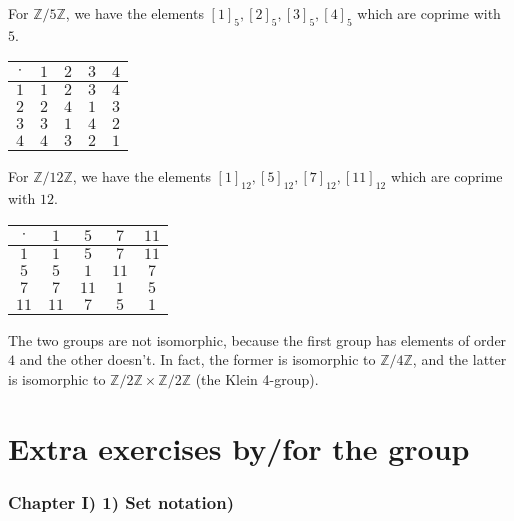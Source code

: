 \documentclass[12pt, letterpaper, twoside]{report}
\begin{document}
For $\mathbb{Z}/5\mathbb{Z}$, we have the elements $[1]_5, [2]_5, [3]_5, [4]_5$ which are coprime with $5$.

\vspace{1em}
\begin{tabular}{|c||c|c|c|c|}
\hline
$\cdot$ & $1$ & $2$ & $3$ & $4$ \\ \hline \hline
$1    $ & $1$ & $2$ & $3$ & $4$ \\ \hline
$2    $ & $2$ & $4$ & $1$ & $3$ \\ \hline
$3    $ & $3$ & $1$ & $4$ & $2$ \\ \hline
$4    $ & $4$ & $3$ & $2$ & $1$ \\ \hline
\end{tabular}
\vspace{1em}

For $\mathbb{Z}/12\mathbb{Z}$, we have the elements $[1]_{12}, [5]_{12}, [7]_{12}, [11]_{12}$ which are coprime with $12$.

\vspace{1em}
\begin{tabular}{|c||c|c|c|c|}
\hline
$\cdot$ & $ 1$ & $ 5$ & $ 7$ & $11$ \\ \hline \hline
$1    $ & $ 1$ & $ 5$ & $ 7$ & $11$ \\ \hline
$5    $ & $ 5$ & $ 1$ & $11$ & $ 7$ \\ \hline
$7    $ & $ 7$ & $11$ & $ 1$ & $ 5$ \\ \hline
$11   $ & $11$ & $ 7$ & $ 5$ & $ 1$ \\ \hline
\end{tabular}
\vspace{1em}

The two groups are not isomorphic, because the first group has elements of order $4$ and the other doesn't. In fact, the former is isomorphic to $\mathbb{Z}/4\mathbb{Z}$, and the latter is isomorphic to $\mathbb{Z}/2\mathbb{Z} \times \mathbb{Z}/2\mathbb{Z}$ (the Klein 4-group).

\newpage
\part{Extra exercises by/for the group}

\section*{Chapter I) 1) Set notation)}
\end{document}

